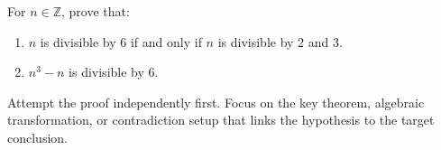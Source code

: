 
\begin{problem}
For $n \in \mathbb{Z}$, prove that:
\begin{enumerate}[label=(\alph*)]
    \item $n$ is divisible by 6 if and only if $n$ is divisible by 2 and 3.
    \item $n^3 - n$ is divisible by 6.
\end{enumerate}
\end{problem}

\begin{hint}
Attempt the proof independently first. Focus on the key theorem, algebraic transformation, or contradiction setup that links the hypothesis to the target conclusion.
\end{hint}

